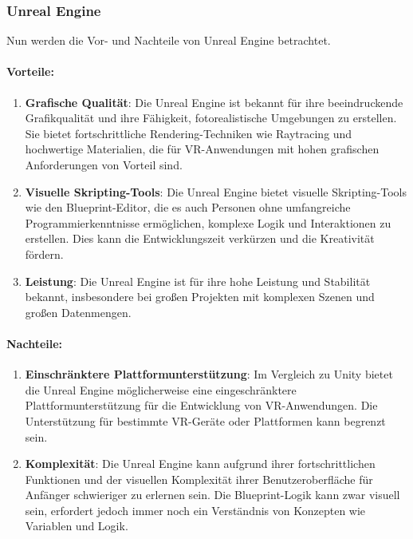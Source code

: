 \subsubsection{Unreal Engine}
Nun werden die Vor- und Nachteile von Unreal Engine betrachtet.
\paragraph{Vorteile:}

\begin{enumerate}
\item \textbf{Grafische Qualität}: Die Unreal Engine ist bekannt für ihre beeindruckende Grafikqualität und ihre Fähigkeit, fotorealistische Umgebungen zu erstellen. Sie bietet fortschrittliche Rendering-Techniken wie Raytracing und hochwertige Materialien, die für VR-Anwendungen mit hohen grafischen Anforderungen von Vorteil sind.
\item \textbf{Visuelle Skripting-Tools}: Die Unreal Engine bietet visuelle Skripting-Tools wie den Blueprint-Editor, die es auch Personen ohne umfangreiche Programmierkenntnisse ermöglichen, komplexe Logik und Interaktionen zu erstellen. Dies kann die Entwicklungszeit verkürzen und die Kreativität fördern.

\item \textbf{Leistung}: Die Unreal Engine ist für ihre hohe Leistung und Stabilität bekannt, insbesondere bei großen Projekten mit komplexen Szenen und großen Datenmengen.
\end{enumerate}

\paragraph{Nachteile:}

\begin{enumerate}
\item \textbf{Einschränktere Plattformunterstützung}: Im Vergleich zu Unity bietet die Unreal Engine möglicherweise eine eingeschränktere Plattformunterstützung für die Entwicklung von VR-Anwendungen. Die Unterstützung für bestimmte VR-Geräte oder Plattformen kann begrenzt sein.
\item \textbf{Komplexität}: Die Unreal Engine kann aufgrund ihrer fortschrittlichen Funktionen und der visuellen Komplexität ihrer Benutzeroberfläche für Anfänger schwieriger zu erlernen sein. Die Blueprint-Logik kann zwar visuell sein, erfordert jedoch immer noch ein Verständnis von Konzepten wie Variablen und Logik.
\end{enumerate}

